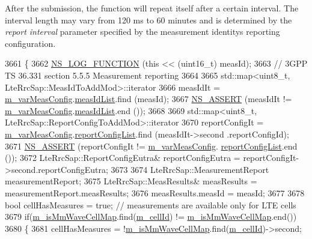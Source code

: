 After the submission, the function will repeat itself after a certain interval. The interval length may vary from 120 ms to 60 minutes and is determined by the {\itshape report interval} parameter specified by the measurement identity\textquotesingle{}s reporting configuration. 
\begin{DoxyCode}
3661 \{
3662   \hyperlink{log-macros-disabled_8h_a90b90d5bad1f39cb1b64923ea94c0761}{NS\_LOG\_FUNCTION} (\textcolor{keyword}{this} << (uint16\_t) measId);
3663   \textcolor{comment}{//  3GPP TS 36.331 section 5.5.5 Measurement reporting}
3664 
3665   std::map<uint8\_t, LteRrcSap::MeasIdToAddMod>::iterator 
3666     measIdIt = \hyperlink{classns3_1_1LteUeRrc_a27a7773eedfdab964d2514d9eeb1c562}{m\_varMeasConfig}.\hyperlink{structns3_1_1LteUeRrc_1_1VarMeasConfig_aa7ad91f943892cec48ffa9a5ae872e8c}{measIdList}.find (measId);
3667   \hyperlink{assert_8h_a6dccdb0de9b252f60088ce281c49d052}{NS\_ASSERT} (measIdIt != \hyperlink{classns3_1_1LteUeRrc_a27a7773eedfdab964d2514d9eeb1c562}{m\_varMeasConfig}.\hyperlink{structns3_1_1LteUeRrc_1_1VarMeasConfig_aa7ad91f943892cec48ffa9a5ae872e8c}{measIdList}.end ());
3668 
3669   std::map<uint8\_t, LteRrcSap::ReportConfigToAddMod>::iterator 
3670     reportConfigIt = \hyperlink{classns3_1_1LteUeRrc_a27a7773eedfdab964d2514d9eeb1c562}{m\_varMeasConfig}.\hyperlink{structns3_1_1LteUeRrc_1_1VarMeasConfig_a3ebdd65b8ad3393b5e869599e2a0afff}{reportConfigList}.find (measIdIt->second
      .reportConfigId);
3671   \hyperlink{assert_8h_a6dccdb0de9b252f60088ce281c49d052}{NS\_ASSERT} (reportConfigIt != \hyperlink{classns3_1_1LteUeRrc_a27a7773eedfdab964d2514d9eeb1c562}{m\_varMeasConfig}.
      \hyperlink{structns3_1_1LteUeRrc_1_1VarMeasConfig_a3ebdd65b8ad3393b5e869599e2a0afff}{reportConfigList}.end ());
3672   LteRrcSap::ReportConfigEutra& reportConfigEutra = reportConfigIt->second.reportConfigEutra;
3673 
3674   LteRrcSap::MeasurementReport measurementReport;
3675   LteRrcSap::MeasResults& measResults = measurementReport.measResults;
3676   measResults.measId = measId;
3677 
3678   \textcolor{keywordtype}{bool} cellHasMeasures = \textcolor{keyword}{true}; \textcolor{comment}{// measurements are available only for LTE cells}
3679   \textcolor{keywordflow}{if}(\hyperlink{classns3_1_1LteUeRrc_aeeda32d2655317078eb67377e81aea02}{m\_isMmWaveCellMap}.find(\hyperlink{classns3_1_1LteUeRrc_aa9d3317734eea9158371d9fccf3a0c48}{m\_cellId}) != 
      \hyperlink{classns3_1_1LteUeRrc_aeeda32d2655317078eb67377e81aea02}{m\_isMmWaveCellMap}.end())
3680   \{
3681     cellHasMeasures = !\hyperlink{classns3_1_1LteUeRrc_aeeda32d2655317078eb67377e81aea02}{m\_isMmWaveCellMap}.find(\hyperlink{classns3_1_1LteUeRrc_aa9d3317734eea9158371d9fccf3a0c48}{m\_cellId})->second;

\end{DoxyCode}

